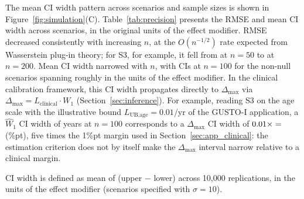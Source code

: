 \documentclass[AMA,Times1COL]{WileyNJDv5}
\begin{document}
The mean CI width pattern across scenarios and sample sizes is shown in Figure~\ref{fig:simulation}(C). Table~\ref{tab:precision} presents the RMSE and mean CI width across scenarios, in the original units of the effect modifier. RMSE decreased consistently with increasing $n$, at the $O(n^{-1/2})$ rate expected from Wasserstein plug-in theory; for S3, for example, it fell from  at $n=50$ to  at $n=200$. Mean CI width narrowed with $n$, with CIs at $n = 100$ for the non-null scenarios spanning roughly  in the units of the effect modifier. In the clinical calibration framework, this CI width propagates directly to $\Delta_{\max}$ via $\Delta_{\max} = L_{\text{clinical}} \cdot W_1$ (Section~\ref{sec:inference}). For example, reading S3 on the age scale with the illustrative bound $L_{\text{UB,age}} = 0.01$/yr of the GUSTO-I application, a $\widehat{W}_1$ CI width of  years at $n = 100$ corresponds to a $\Delta_{\max}$ CI width of $0.01 \times \numval{ciwS3n100calc} = \numval{dmaxWidthS3n100}$ (\%pt), five times the 1\%pt margin used in Section~\ref{sec:app_clinical}: the estimation criterion does not by itself make the $\Delta_{\max}$ interval narrow relative to a clinical margin.

\begin{table}[ht]
\centering
\caption{RMSE and mean CI width of $\widehat{W}_1$ by scenario and sample size, in the original units of the effect modifier.\label{tab:precision}}
\begin{tablenotes}
\item CI width is defined as mean of (upper $-$ lower) across 10{,}000 replications, in the units of the effect modifier (scenarios specified with $\sigma = 10$).
\end{tablenotes}
\end{table}
\end{document}
